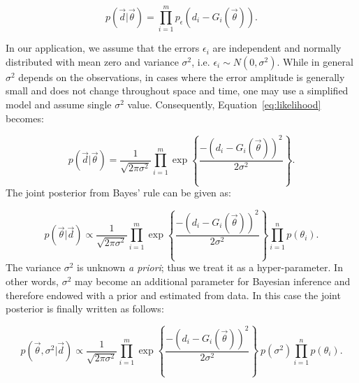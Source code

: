 \begin{equation} 
p(\vec d |  \vec{\theta}) 
= 
\prod_{i=1}^m  
p_\epsilon (d_i - G_i(\vec \theta)).  	
\label{eq:likelihood}
\end{equation}

In our application, we assume that the errors $\epsilon_i$ are independent
and normally distributed with mean
zero and variance $\sigma^2$, i.e. 
$\epsilon_i \sim N(0,\sigma^2)$. 
While in general $\sigma^2$ depends on the observations, in cases where the error
amplitude is generally small and does not change throughout space and time, one may use
a simplified model and assume single $\sigma^2$ value.
Consequently, Equation~\eqref{eq:likelihood} becomes:

\begin{equation} 
p(\vec d |  \vec{\theta}) 
= 
\frac{1}{\sqrt{2 \pi \sigma^2}}\prod_{i=1}^m   
\exp \left\lbrace \frac{-(d_i - G_i(\vec \theta))^2}{2 \sigma^2} \right\rbrace. 	
\label{eq:likelihood2}
\end{equation}
The joint posterior from Bayes' rule can be given as:

\begin{equation} 
p(\vec{\theta}| \vec d)
\propto
\frac{1}{\sqrt{2 \pi \sigma^2}}   \prod_{i=1}^m  
\exp \left\lbrace \frac{-(d_i - G_i(\vec \theta))^2}{2 \sigma^2} \right\rbrace  
\prod_{i=1}^n p(\theta_i).
\end{equation}
The variance $\sigma^2$ is unknown \emph{a priori}; thus we treat it as a hyper-parameter.
In other words, $\sigma^2$ may become an additional parameter for Bayesian inference and  
therefore endowed with a prior and estimated from data. In this case the joint posterior is finally written as follows:

\begin{equation} 
p(\vec{\theta},\sigma^2 | \vec d)
\propto
\frac{1}{\sqrt{2 \pi \sigma^2}}   \prod_{i=1}^m  
\exp \left\lbrace \frac{-(d_i - G_i(\vec \theta))^2}{2 \sigma^2} \right\rbrace
\ p(\sigma^2) \prod_{i=1}^n p(\theta_i).
\label{eq:post}
\end{equation}

